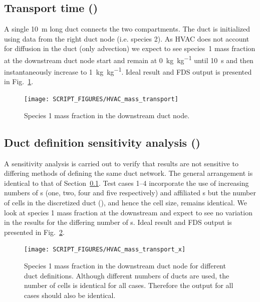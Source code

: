 \documentclass[11pt]{book}
\begin{document}
\subsection{Transport time (\texorpdfstring{}{HVAC\_mass\_transport})}
\label{HVAC_mass_transport}
A single \SI{10}{\meter} long duct connects the two compartments. The duct is initialized using data from the right duct node (i.e. species 2). As HVAC does not account for diffusion in the duct (only advection) we expect to see species~1 mass fraction at the downstream duct node start and remain at \SI[per-mode=symbol]{0}{\kilogram\per\kilogram} until \SI{10}{\second} and then instantaneously increase to \SI[per-mode=symbol]{1}{\kilogram\per\kilogram}. Ideal result and FDS output is presented in Fig.~\ref{fig_HVAC_mass_transport}.

\begin{figure}[ht]
\centering
\texttt{[image: SCRIPT\_FIGURES/HVAC\_mass\_transport]}
\caption[ test case.]{Species \num{1} mass fraction in the downstream duct node.}
\label{fig_HVAC_mass_transport}
\end{figure}

\subsection{Duct definition sensitivity analysis (\texorpdfstring{}{HVAC\_mass\_transport\_\x})}
\label{HVAC_mass_transport_1}
\label{HVAC_mass_transport_2}
\label{HVAC_mass_transport_3}
\label{HVAC_mass_transport_4}
A sensitivity analysis is carried out to verify that results are not sensitive to differing methods of defining the same duct network. The general arrangement is identical to that of Section~\ref{HVAC_mass_transport}. Test cases \numrange{1}{4} incorporate the use of increasing numbers of s (one, two, four and five respectively) and affiliated s but the number of cells in the discretized duct (), and hence the cell size, remains identical. We look at species \num{1} mass fraction at the downstream  and expect to see no variation in the results for the differing number of s. Ideal result and FDS output is presented in Fig.~\ref{fig_HVAC_mass_transport_x}.

\begin{figure}[ht]
\centering
\texttt{[image: SCRIPT\_FIGURES/HVAC\_mass\_transport\_x]}
\caption[ test case.]{Species \num{1} mass fraction in the downstream duct node for different duct definitions. Although different numbers of ducts are used, the number of cells is identical for all cases. Therefore the output for all cases should also be identical.}
\label{fig_HVAC_mass_transport_x}
\end{figure}
\end{document}
